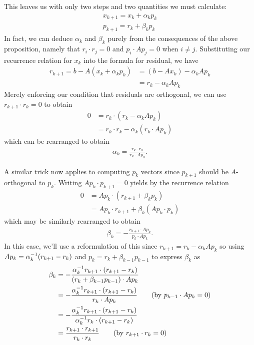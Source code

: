 \documentclass[11pt]{article}
\begin{document}
This leaves us with only two steps and two quantities we must calculate: \begin{gather*}
x_{k+1} = x_k + \alpha_k p_k \\
p_{k+1} = r_k + \beta_k p_k 
\end{gather*}
In fact, we can deduce $\alpha_k$ and $\beta_k$ purely from the consequences of the above proposition, namely that $r_i \cdot r_j = 0$ and $p_i \cdot A p_j = 0$ when $i \neq j$. Substituting our recurrence relation for $x_k$ into the formula for residual, we have \begin{align*}
r_{k+1} = b - A(x_k + \alpha_k p_k) &= (b - Ax_k) - \alpha_k A p_k \\
&= r_k - \alpha_k A p_k
\end{align*}
Merely enforcing our condition that residuals are orthogonal, we can use $r_{k+1} \cdot r_k = 0$ to obtain \begin{align*}
0 &= r_k \cdot (r_k - \alpha_k A p_k) \\
&= r_k \cdot r_k - \alpha_k (r_k \cdot A p_k) 
\end{align*}
which can be rearranged to obtain \begin{gather*}
\alpha_k = \frac{r_k \cdot r_k}{r_k \cdot A p_k}.
\end{gather*}

A similar trick now applies to computing $p_k$ vectors since $p_{k+1}$ should be $A$-orthogonal to $p_k$. Writing $A p_k \cdot p_{k+1} = 0$ yields by the recurrence relation \begin{align*}
0 &= A p_k \cdot (r_{k+1} + \beta_k p_k) \\
&= A p_k \cdot r_{k+1} + \beta_k (A p_k \cdot p_k)
\end{align*}
which may be similarly rearranged to obtain \begin{gather*}
\beta_k = - \frac{r_{k+1} \cdot A p_k }{p_k \cdot A p_k}.
\end{gather*}
In this case, we'll use a reformulation of this since $r_{k+1} = r_k - \alpha_k A p_k $ so using $A p_k = \alpha_k^{-1} (r_{k+1} - r_k)$ and $p_k = r_k + \beta_{k-1} p_{k-1} $ to express $\beta_k$ as \begin{align*}
\beta_k &= - \frac{\alpha_k^{-1} r_{k+1} \cdot (r_{k+1} - r_k) }{ (r_k + \beta_{k-1} p_{k-1}) \cdot Ap_k} \\
&= - \frac{\alpha_k^{-1} r_{k+1} \cdot (r_{k+1} - r_k) }{ r_k \cdot Ap_k} \hspace{2em} \text{(by $p_{k-1} \cdot A p_k = 0$)}\\
&= - \frac{\alpha_k^{-1} r_{k+1} \cdot (r_{k+1} - r_k) }{ \alpha_k^{-1} r_k \cdot (r_{k+1} - r_k)} \\
&= \frac{ r_{k+1} \cdot r_{k+1} }{ r_k \cdot  r_k} \hspace{2em} \text{(by $r_{k+1} \cdot r_k = 0$)}
\end{align*}
\end{document}
